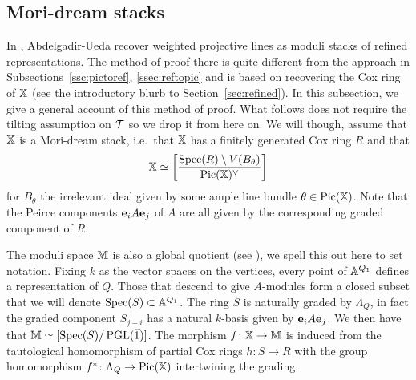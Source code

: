 \documentclass[12pt]{amsart}
\begin{document}
\subsection{Mori-dream stacks}\label{ssec:nice}
In \cite{AU}, Abdelgadir-Ueda recover weighted projective lines as moduli stacks of refined representations. The method of proof there is quite different from the approach in Subsections~\ref{ssc:pictoref}, \ref{ssec:reftopic} and is based on recovering the Cox ring of $\mathbb{X}$ (see the introductory blurb to Section~\ref{sec:refined}). In this subsection, we give a general account of this method of proof. What follows does not require the tilting assumption on $\mathcal{T}$ so we drop it from here on. We will though, assume that $\mathbb{X}$ is a Mori-dream stack, i.e.\ that $\mathbb{X}$ has a finitely generated Cox ring $R$ and that $$\mathbb{X} \simeq \bigg[\frac{\operatorname{Spec}(R) \setminus V(B_\theta)}{\operatorname{Pic}(\mathbb{X})^\vee}\bigg]$$ for $B_\theta$ the irrelevant ideal given by some ample line bundle $\theta \in \operatorname{Pic}(\mathbb{X})$. Note that the Peirce components $\mathbf{e}_i A \mathbf{e}_j$ of $A$ are all given by the corresponding graded component of $R$. 

The moduli space $\mathbb{M}$ is also a global quotient (see \cite[Sections 4 \& 5]{Ki}), we spell this out here to set notation.
Fixing $k$ as the vector spaces on the vertices, every point of $\mathbb{A}^{Q_1}$ defines a representation of $Q$.
Those that descend to give $A$-modules form a closed subset that we will denote $\operatorname{Spec}(S) \subset \mathbb{A}^{Q_1}$.
The ring $S$ is naturally graded by $\Lambda_Q$, in fact the graded component $S_{j-i}$ has a natural $k$-basis given by $\mathbf{e}_i A \mathbf{e}_j$. 
We then have that $\mathbb{M} \simeq [\operatorname{Spec}(S)/\operatorname{PGL}(\vec{1})]$.
The morphism $f \colon \mathbb{X} \rightarrow \mathbb{M}$ is induced from the  tautological homomorphism of partial Cox rings $h \colon S \rightarrow R$ with the group homomorphism $f^* \colon \Lambda_Q \rightarrow \operatorname{Pic}(\mathbb{X})$ intertwining the grading.
\end{document}
